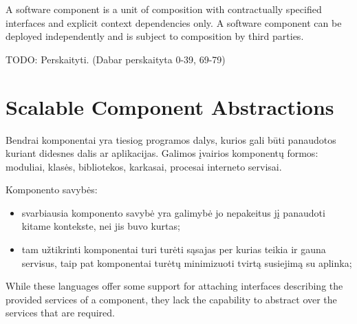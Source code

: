 \begin{defn}
  A software component is a unit of composition with contractually
  specified interfaces and explicit context dependencies only. A
  software component can be deployed independently and is subject
  to composition by third parties.
  \cite[41]{cs-beyond-object-oriented-programming}
\end{defn}

TODO: Perskaityti. (Dabar perskaityta 0-39, 69-79)

\section{Scalable Component Abstractions}

Bendrai komponentai yra tiesiog programos dalys, kurios gali būti
panaudotos kuriant didesnes dalis ar aplikacijas. Galimos įvairios
komponentų formos: moduliai, klasės, bibliotekos, karkasai, procesai
interneto servisai.

Komponento savybės:
\begin{itemize}
  \item svarbiausia komponento savybė yra galimybė jo nepakeitus jį
    panaudoti kitame kontekste, nei jis buvo kurtas;
  \item tam užtikrinti komponentai turi turėti sąsajas per kurias
    teikia ir gauna servisus, taip pat komponentai turėtų minimizuoti
    tvirtą susiejimą  su aplinka;
\end{itemize}

\begin{note}
  While these languages offer some support for attaching interfaces
  describing the provided services of a component, they lack the
  capability to abstract over the services that are required.
  \cite[1]{scalable-component-abstractions}
\end{note}

